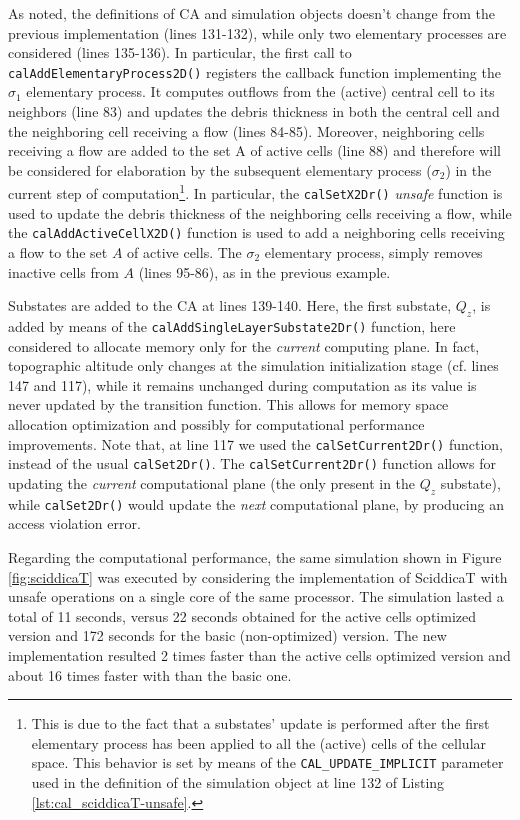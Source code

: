 As noted, the definitions of CA and simulation objects doesn't
change from the previous implementation (lines 131-132), while only
two elementary processes are considered (lines 135-136). In
particular, the first call to \verb'calAddElementaryProcess2D()'
registers the callback function implementing the $\sigma_1$ elementary
process. It computes outflows from the (active) central cell to its
neighbors (line 83) and updates the debris thickness in both the
central cell and the neighboring cell receiving a flow (lines
84-85). Moreover, neighboring cells receiving a flow are added to the
set A of active cells (line 88) and therefore will be considered for
elaboration by the subsequent elementary process ($\sigma_2$) in the
current step of computation\footnote{This is due to the fact that a
  substates' update is performed after the first elementary process
  has been applied to all the (active) cells of the cellular
  space. This behavior is set by means of the
  \texttt{CAL\_UPDATE\_IMPLICIT} parameter used in the definition of
  the simulation object at line 132 of Listing
  \ref{lst:cal_sciddicaT-unsafe}.}. In particular, the
\verb'calSetX2Dr()' \emph{unsafe} function is used to update the
debris thickness of the neighboring cells receiving a flow, while the
\verb'calAddActiveCellX2D()' function is used to add a neighboring
cells receiving a flow to the set $A$ of active cells.  The $\sigma_2$
elementary process, simply removes inactive cells from $A$ (lines
95-86), as in the previous example.


Substates are added to the CA at lines 139-140. Here, the first
substate, $Q_z$, is added by means of the
\verb'calAddSingleLayerSubstate2Dr()' function, here considered
to allocate memory only for the \emph{current} computing plane. In
fact, topographic altitude only changes at the simulation
initialization stage (cf. lines 147 and 117), while it remains
unchanged during computation as its value is never updated by the
transition function. This allows for memory space allocation
optimization and possibly for computational performance
improvements. Note that, at line 117 we used the
\verb'calSetCurrent2Dr()' function, instead of the usual
\verb'calSet2Dr()'. The \verb'calSetCurrent2Dr()' function allows for
updating the \emph{current} computational plane (the only present in
the $Q_z$ substate), while \verb'calSet2Dr()' would update the
\emph{next} computational plane, by producing an access violation
error.

Regarding the computational performance, the same simulation shown in
Figure \ref{fig:sciddicaT} was executed by considering the
implementation of SciddicaT with unsafe operations on a single core of
the same processor. The simulation lasted a total of 11 seconds,
versus 22 seconds obtained for the active cells optimized version and
172 seconds for the basic (non-optimized) version. The new
implementation resulted 2 times faster than the active cells optimized
version and about 16 times faster with than the basic one.



